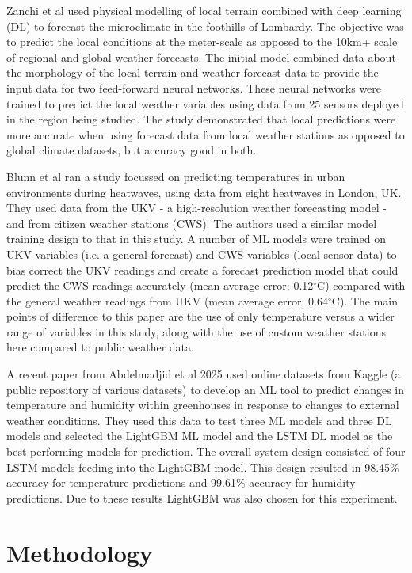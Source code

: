 \documentclass[conference]{IEEEtran}
\begin{document}
Zanchi et al \cite{zanchi2023harnessing} used physical modelling of local
terrain combined with deep learning (DL) to forecast the microclimate in the
foothills of Lombardy. The objective was to predict the local conditions at the
meter-scale as opposed to the 10km+ scale of regional and global weather
forecasts. The initial model combined data about the morphology of the local
terrain and weather forecast data to provide the input data for two feed-forward
neural networks. These neural networks were trained to predict the local weather
variables using data from 25 sensors deployed in the region being studied.  The
study demonstrated that local predictions were more accurate when using forecast
data from local weather stations as opposed to global climate datasets, but
accuracy good in both.

Blunn et al \cite{blunn2024machine} ran a study focussed on predicting
temperatures in urban environments during heatwaves, using data from eight
heatwaves in London, UK. They used data from the UKV - a high-resolution weather
forecasting model - and from citizen weather stations (CWS). The authors used a
similar model training design to that in this study. A number of ML models were
trained on UKV variables (i.e. a general forecast) and CWS variables (local
sensor data) to bias correct the UKV readings and create a forecast prediction
model that could predict the CWS readings accurately (mean average error:
0.12\(^\circ\)C) compared with the general weather readings from UKV (mean
average error: 0.64\(^\circ\)C). The main points of difference to this paper are
the use of only temperature versus a wider range of variables in this study,
along with the use of custom weather stations here compared to public weather
data.

A recent paper from Abdelmadjid et al 2025 \cite{abdelmadjid2025enhancing} used
online datasets from Kaggle (a public repository of various datasets) to develop
an ML tool to predict changes in temperature and humidity within greenhouses in
response to changes to external weather conditions.  They used this data to test
three ML models and three DL models and selected the LightGBM ML model and the
LSTM DL model as the best performing models for prediction. The overall system
design consisted of four LSTM models feeding into the LightGBM model. This
design resulted in 98.45\% accuracy for temperature predictions and 99.61\%
accuracy for humidity predictions. Due to these results LightGBM was also chosen
for this experiment.

\section{Methodology}\label{METH}
\end{document}
